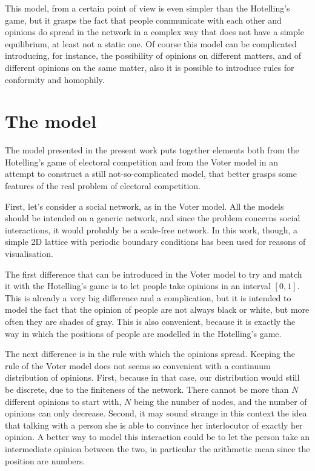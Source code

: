 \documentclass[11pt,a4paper,twocolumn]{article}
\begin{document}
This model, from a certain point of view is even simpler than the Hotelling's game, but it grasps the fact that people communicate with each other and opinions do spread in the network in a complex way that does not have a simple equilibrium, at least not a static one.
Of course this model can be complicated introducing, for instance, the possibility of opinions on different matters, and of different opinions on the same matter, also it is possible to introduce rules for conformity and homophily.

\section*{The model}
\vspace*{-0.2cm}
The model presented in the present work puts together elements both from the Hotelling's game of electoral competition and from the Voter model in an attempt to construct a still not-so-complicated model, that better grasps some features of the real problem of electoral competition.

First, let's consider a social network, as in the Voter model. All the models should be intended on a generic network, and since the problem concerns social interactions, it would probably be a scale-free network. In this work, though, a simple 2D lattice with periodic boundary conditions has been used for reasons of visualisation. 

The first difference that can be introduced in the Voter model to try and match it with the Hotelling's game is to let people take opinions in an interval $[0,1]$. This is already a very big difference and a complication, but it is intended to model the fact that the opinion of people are not always black or white, but more often they are shades of gray. This is also convenient, because it is exactly the way in which the positions of people are modelled in the Hotelling's game.

The next difference is in the rule with which the opinions spread. Keeping the rule of the Voter model does not seems so convenient with a continuum distribution of opinions. First, because in that case, our distribution would still be discrete, due to the finiteness of the network. There cannot be more than $N$ different opinions to start with, $N$ being the number of nodes, and the number of opinions can only decrease. Second, it may sound strange in this context the idea that talking with a person she is able to convince her interlocutor of exactly her opinion. A better way to model this interaction could be to let the person take an intermediate opinion between the two, in particular the arithmetic mean since the position are numbers.
\end{document}
